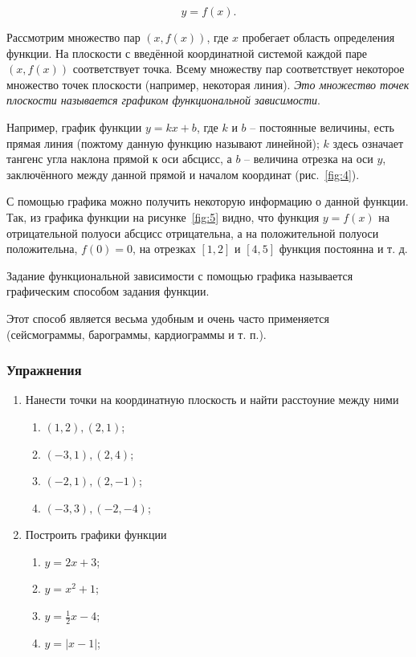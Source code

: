 $$y = f(x).$$

Рассмотрим множество пар $(x, f(x))$, где $x$ пробегает область определения
функции. На плоскости с введённой координатной системой каждой паре $(x,
f(x))$ соответствует точка. Всему множеству пар соответствует некоторое
множество точек плоскости (например, некоторая линия). \textit{Это множество
точек плоскости называется графиком функциональной зависимости}.

Например, график функции $y = kx + b$, где $k$ и $b$ -- постоянные величины,
есть прямая линия (пожтому данную функцию называют линейной); $k$ здесь
означает тангенс угла наклона прямой к оси абсцисс, а $b$ -- величина отрезка
на оси $y$, заключённого между данной прямой и началом координат
(рис.~\ref{fig:4}).

С помощью графика можно получить некоторую информацию о данной функции. Так, из
графика функции на рисунке~\ref{fig:5} видно, что функция $y=f(x)$ на
отрицательной полуоси абсцисс отрицательна, а на положительной полуоси
положительна, $f(0) = 0$, на отрезках $[1, 2]$ и $[4, 5]$ функция постоянна и
т. д.

Задание функциональной зависимости с помощью графика называется графическим
способом задания функции.


Этот способ является весьма удобным и очень часто применяется (сейсмограммы,
барограммы, кардиограммы и т. п.).

\subsubsection{Упражнения}
\begin{enumerate}
	\item Нанести точки на координатную плоскость и найти расстоуние между
		ними
		\begin{enumerate}
			\item $(1, 2), (2, 1)$;
			\item $(-3, 1), (2, 4)$;
			\item $(-2, 1), (2, -1)$;
			\item $(-3, 3), (-2, -4)$;
		\end{enumerate}
	\item Построить графики функции
		\begin{enumerate}
			\item $y = 2x + 3$;
			\item $y = x^2 + 1$;
			\item $y = \frac{1}{2}x - 4$;
			\item $y = |x - 1|$;
		\end{enumerate}
\end{enumerate}

